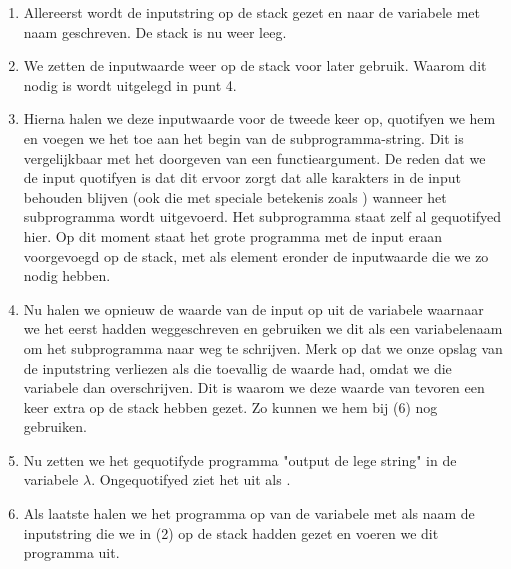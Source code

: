 \begin{enumerate}
	\item Allereerst wordt de inputstring op de stack gezet en naar de variabele
		met naam  geschreven. De stack is nu weer leeg.
	\item We zetten de inputwaarde weer op de stack voor later gebruik. Waarom
		dit nodig is wordt uitgelegd in punt 4.
	\item Hierna halen we deze inputwaarde voor de tweede keer op, quotifyen we
		hem en voegen we het toe aan het begin van de subprogramma-string. Dit is
		vergelijkbaar met het doorgeven van een functieargument. De reden dat we de
		input quotifyen is dat dit ervoor zorgt dat alle karakters in de input
		behouden blijven (ook die met speciale betekenis zoals
		\lit{\textbackslash{}}) wanneer het subprogramma wordt uitgevoerd. Het
		subprogramma staat zelf al gequotifyed hier. Op dit moment staat het grote
		programma met de input eraan voorgevoegd op de stack, met als element
		eronder de inputwaarde die we zo nodig hebben.
	\item Nu halen we opnieuw de waarde van de input op uit de variabele waarnaar
		we het eerst hadden weggeschreven en gebruiken we dit als een variabelenaam
		om het subprogramma naar weg te schrijven. Merk op dat we onze opslag van
		de inputstring verliezen als die toevallig de waarde 
		had, omdat we die variabele dan overschrijven. Dit is waarom we deze waarde
		van tevoren een keer extra op de stack hebben gezet. Zo kunnen we hem bij
		(6) nog gebruiken.
	\item Nu zetten we het gequotifyde programma "output de lege string" in de
		variabele $\lambda$. Ongequotifyed ziet het uit als .
	\item Als laatste halen we het programma op van de variabele met als naam de
		inputstring die we in (2) op de stack hadden gezet en voeren we dit
		programma uit.
\end{enumerate}
